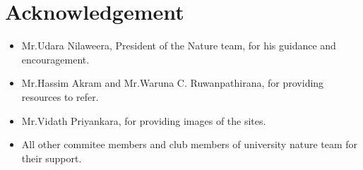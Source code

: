 \chapter{Acknowledgement}
\label{cp:Acknowledgement}
\begin{itemize}
    \item Mr.Udara Nilaweera, President of the Nature team, for his guidance and encouragement.\\
    \item Mr.Hassim Akram and Mr.Waruna C. Ruwanpathirana, for providing resources to refer.\\
    \item Mr.Vidath Priyankara, for providing images of the sites.
    \\
    \item All other commitee members and club members of university nature team for their support.
\end{itemize}